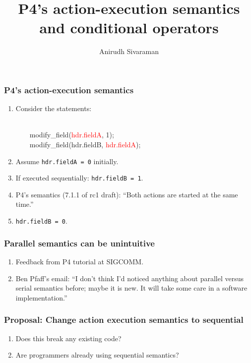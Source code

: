 \documentclass[aspectratio=169]{beamer}
\title{P4's action-execution semantics and conditional operators}
\author{Anirudh Sivaraman}
\institute{Massachusetts Institute of Technology}
\date{}
\begin{document}
\begin{frame}

  \titlepage

\end{frame}

\begin{frame}[fragile]
  \frametitle{P4's action-execution semantics}
  \begin{enumerate}
    \item<1-> Consider the statements:
      \begin{texttt} \\
        \ \ \ \ modify\_field(\textcolor{red}{hdr.fieldA}, 1); \\
        \ \ \ \ modify\_field(hdr.fieldB, \textcolor{red}{hdr.fieldA}); \\
      \end{texttt}
    \item<2-> Assume \texttt{hdr.fieldA = 0} initially.
    \item<3-> If executed sequentially: \texttt{hdr.fieldB = 1}.
    \item<4-> P4's semantics (7.1.1 of rc1 draft): ``Both actions are started at the same time.''
    \item<5-> \texttt{hdr.fieldB = 0}.
  \end{enumerate}
\end{frame}

\begin{frame}[fragile]
  \frametitle{Parallel semantics can be unintuitive}
  \begin{enumerate}
  \item<1-> Feedback from P4 tutorial at SIGCOMM.
  \item<2-> Ben Pfaff's email:
  ``I don't think I'd noticed anything about parallel versus serial
    semantics before; maybe it is new.  It will take some care in a
    software implementation.''
  \end{enumerate}
\end{frame}

\begin{frame}[fragile]
  \frametitle{Proposal: Change action execution semantics to sequential}
  \begin{enumerate}
  \item<1-> Does this break any existing code?
  \item<2-> Are programmers already using sequential semantics?
  \end{enumerate}
\end{frame}
\end{document}
